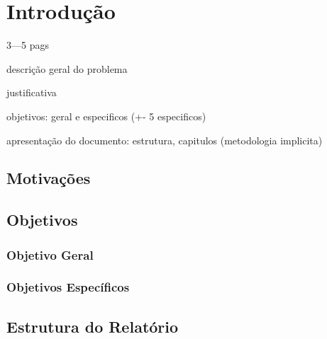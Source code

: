 
\chapter{Introdução}
3---5 pags

descrição geral do problema

justificativa

objetivos: geral e especificos (+- 5 especificos)

apresentação do documento: estrutura, capitulos (metodologia implicita)
\section{Motivações}

\section{Objetivos}
\subsection{Objetivo Geral}
\subsection{Objetivos Específicos}

\section{Estrutura do Relatório}
